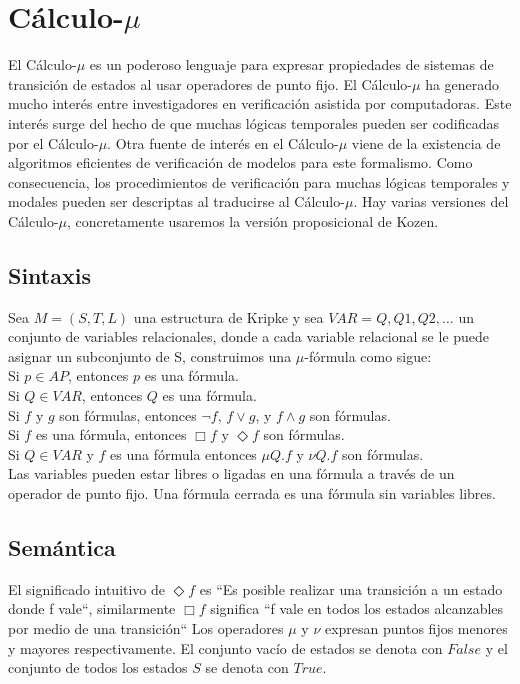 \section{Cálculo-$\mu$}

El Cálculo-$\mu$ es un poderoso lenguaje para expresar propiedades de sistemas de transición de estados al usar operadores de punto fijo. El Cálculo-$\mu$ ha generado mucho interés entre investigadores en verificación asistida por computadoras. Este interés surge del hecho de que muchas lógicas temporales pueden ser codificadas por el Cálculo-$\mu$. Otra fuente de interés en el Cálculo-$\mu$ viene de la existencia de algoritmos eficientes de verificación de modelos para este formalismo. Como consecuencia, los procedimientos de verificación para muchas lógicas temporales y modales pueden ser descriptas al traducirse al Cálculo-$\mu$. Hay varias versiones del Cálculo-$\mu$, concretamente usaremos la versión proposicional de Kozen\cite{Kozen:3}.

\subsection{Sintaxis}

Sea $M = (S, T, L)$ una estructura de Kripke y sea $VAR = {Q, Q1, Q2, …}$ un conjunto de variables relacionales, donde a cada variable relacional se le puede asignar un subconjunto de S, construimos una $\mu$-fórmula como sigue: \\

Si $p \in AP$, entonces $p$ es una fórmula. \\
Si $Q \in VAR$, entonces $Q$ es una fórmula. \\
Si $f$ y $g$ son fórmulas, entonces $\neg f$, $f \lor g$, y $f \land g$ son fórmulas. \\
Si $f$ es una fórmula, entonces $\Box f$ y $\Diamond f$ son fórmulas. \\
Si $Q \in VAR$ y $f$ es una fórmula entonces $\mu Q.f$ y $\nu Q.f$ son fórmulas. \\

Las variables pueden estar libres o ligadas en una fórmula a través de un operador de punto fijo. Una fórmula cerrada es una fórmula sin variables libres.

\subsection{Semántica}

El significado intuitivo de $\Diamond f$ es “Es posible realizar una transición a un estado donde f vale“, similarmente $\Box f$ significa “f vale en todos los estados alcanzables por medio de una transición“
Los operadores $\mu$ y $\nu$ expresan puntos fijos menores y mayores respectivamente. El conjunto vacío de estados se denota con $False$ y el conjunto de todos los estados $S$ se denota con $True$.\\

